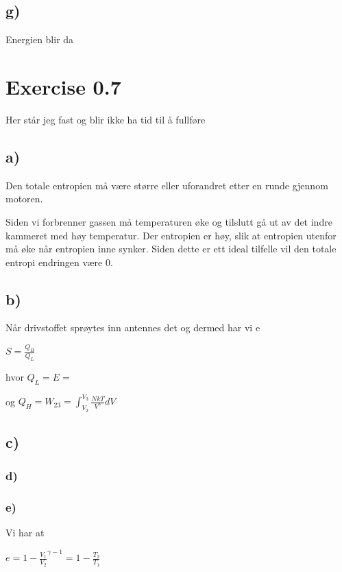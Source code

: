 \documentclass[12pt]{article}
\begin{document}
\subsection*{g)}

Energien blir da

\section{Exercise 0.7}	

Her står jeg fast og blir ikke ha tid til å fullføre

\subsection*{a)}


 Den totale entropien må være større eller uforandret etter en runde gjennom motoren. 
 
 Siden vi forbrenner gassen må temperaturen øke og tilslutt gå ut av det indre kammeret med høy temperatur. Der entropien er høy, slik at entropien utenfor må øke når entropien inne synker. Siden dette er ett ideal tilfelle vil den totale entropi endringen være 0. 
 
\subsection*{b)}
 
 Når drivstoffet sprøytes inn antennes det og dermed har vi e
 
 $ S = \frac{Q_H}{Q_L}$
 
 hvor $Q_L = E = $
 
 og $Q_H = W_{23} = \int_{V_2}^{V_3} \frac{NkT}{V^\gamma}dV $
 
 
 
\subsection*{c)}
 
\subsubsection*{d)}
 
 
\subsubsection*{e)}

Vi har at 

$ e = 1-\frac{V_1}{V_2}^{\gamma - 1} = 1 - \frac{T_2}{T_1}$
\end{document}
